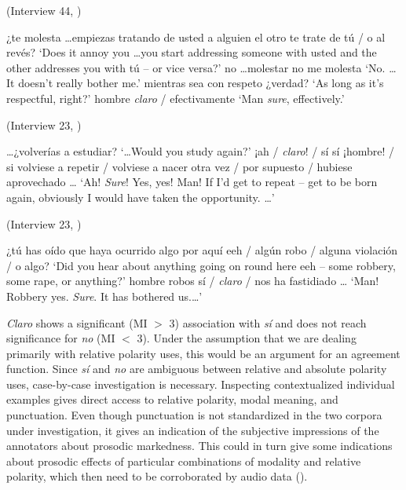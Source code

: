 \begin{exe}
\ex \label{ex:claroPRESEEArespeto} (Interview 44, \cite{PRESEEA.20142020})
	\begin{xlist}[A:]
	 ¿te molesta \ldots empiezas tratando de usted a alguien el otro te trate de tú / o al revés? 
	\glt `Does it annoy you \ldots you start addressing someone with usted and the other addresses you with tú -- or vice versa?' 
	no \ldots molestar no me molesta 
	\glt `No. \ldots It doesn't really bother me.' 
	\sn[] {\ldots }
	mientras sea con respeto ¿verdad? 
	\glt `As long as it's respectful, right?' 
	hombre \textit{claro} / efectivamente  
	\glt `Man \textit{sure}, effectively.' 
	\end{xlist}
	
\ex \label{ex:claroPRESEEAestudiar} (Interview 23, \cite{PRESEEA.20142020})
	\begin{xlist}[A:]
	\ldots ¿volverías a estudiar? 
	\glt `\ldots Would you study again?' 
	¡ah / \textit{claro}! / sí sí  ¡hombre! / si volviese a repetir /  volviese a nacer otra vez / por supuesto / hubiese aprovechado \ldots 
	\glt `Ah! \textit{Sure}! Yes, yes! Man! If I'd get to repeat -- get to be born again, obviously I would have taken the opportunity. \ldots' 
	\end{xlist}

\ex \label{ex:claroPRESEEArobos} (Interview 23, \cite{PRESEEA.20142020})
	\begin{xlist}[A:]
	¿tú has oído que haya ocurrido algo por aquí eeh / algún robo / alguna violación / o algo?
	\glt `Did you hear about anything going on round here eeh -- some robbery, some rape, or anything?' 
	hombre robos sí / \textit{claro} / nos ha fastidiado \ldots 
	\glt `Man! Robbery yes. \textit{Sure}. It has bothered us.\ldots' 
	\end{xlist}
\end{exe}

\textit{Claro} shows a significant (MI $>$ 3) association with \textit{sí} and does not reach significance for \textit{no} (MI $<$ 3). Under the assumption that we are dealing primarily with relative polarity uses, this would be an argument for an agreement function. Since \textit{sí} and \textit{no} are ambiguous between relative and absolute polarity uses, case-by-case investigation is necessary. Inspecting contextualized individual examples gives direct access to relative polarity, modal meaning, and punctuation. Even though punctuation is not standardized in the two corpora under investigation, it gives an indication of the subjective impressions of the annotators about prosodic markedness. This could in turn give some indications about prosodic effects of particular combinations of modality and relative polarity, which then need to be corroborated by audio data (). 

